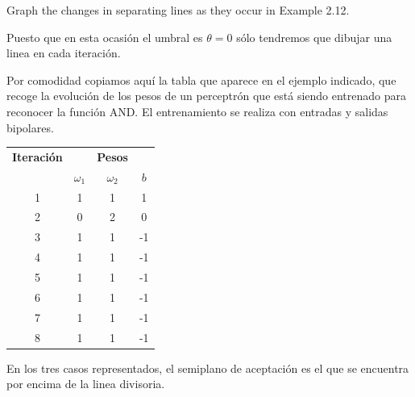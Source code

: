 \begin{problem}[7]
Graph the changes in separating lines as they occur in Example 2.12.
\solution

Puesto que en esta ocasión el umbral es $\theta = 0$ sólo tendremos que dibujar una linea en cada iteración.

Por comodidad copiamos aquí la tabla que aparece en el ejemplo indicado, que recoge la evolución de los pesos de un perceptrón que está siendo entrenado para reconocer la función AND. El entrenamiento se realiza con entradas y salidas bipolares.


\begin{minipage}{0.4\textwidth}
\begin{center}
\begin{tabular}{|c|ccc|}
\hline
\textbf{Iteración} & & \textbf{Pesos} & \\
& $ω_1$ & $ω_2$ & $b$ \\
\hline
1 & 1 & 1 & 1\\
\hline
2 & 0 & 2 & 0\\
\hline
3 & 1 & 1 & -1\\
\hline
4 & 1 & 1 & -1\\
\hline
5 & 1 & 1 & -1\\
\hline
6 & 1 & 1 & -1\\
\hline
7 & 1 & 1 & -1\\
\hline
8 & 1 & 1 & -1 \\
\hline
\end{tabular}
\end{center}
\end{minipage}
\begin{minipage}{0.58\textwidth}
\begin{center}
\end{center}
\end{minipage}

En los tres casos representados, el semiplano de aceptación es el que se encuentra por encima de la linea divisoria.
\end{problem}


